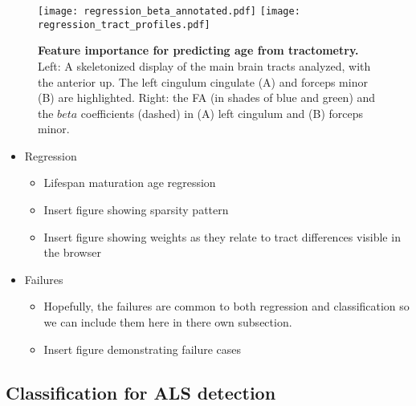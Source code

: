 \begin{figure}[!h]
    \centering
    \texttt{[image: regression\_beta\_annotated.pdf]}
    \texttt{[image: regression\_tract\_profiles.pdf]}
    \caption{{\bf Feature importance for predicting age from tractometry.} Left: A skeletonized display of the main brain tracts analyzed, with the anterior up. The left cingulum cingulate (A) and forceps minor (B) are highlighted. Right: the FA (in shades of blue and green) and the $beta$ coefficients (dashed) in (A) left cingulum and (B) forceps minor.
    }
    \label{fig:regress-beta}
\end{figure}


\begin{itemize}
  \item Regression
    \begin{itemize}
      \item Lifespan maturation age regression
      \item Insert figure showing sparsity pattern
      \item Insert figure showing weights as they relate to tract differences visible in the browser
    \end{itemize}
\end{itemize}
\begin{itemize}
  \item Failures
    \begin{itemize}
      \item Hopefully, the failures are common to both regression
        and classification so we can include them here in there own
        subsection.
      \item Insert figure demonstrating failure cases
    \end{itemize}
\end{itemize}

\subsection*{Classification for ALS detection}

